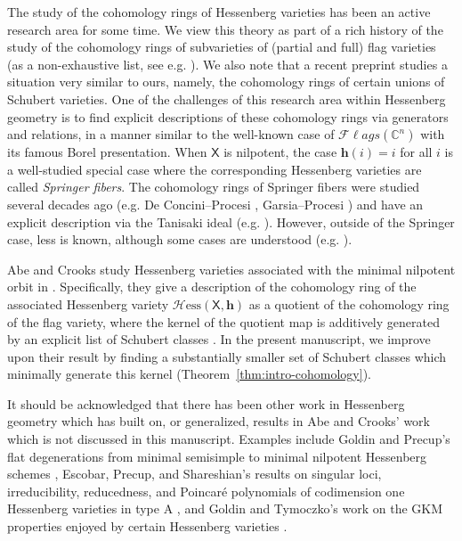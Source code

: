 \documentclass[11pt]{amsart}
\theoremstyle{plain}
\theoremstyle{definition}
\newcommand{\Hess}{\mathcal{H}\mathrm{ess}}
\newcommand{\mx}{\mathsf{X}}
\newcommand{\hess}{{\mathbf h}}
\newcommand{\Fl}{\mathcal{F}\ell ags}
\newcommand{\C}{\mathbb{C}}           %
\numberwithin{equation}{section}
\begin{document}
The study of the cohomology rings of Hessenberg varieties has been an active research area for some time. We view this theory as part of a rich history of the study of the cohomology rings of subvarieties of (partial and full) flag varieties (as a non-exhaustive list, see e.g. \cite{GasharovReiner, MbirikaTymoczko, ReinerWooYong, StDizierYong}).  We also note that a recent preprint \cite{AGR2026} studies a situation very similar to ours, namely, the cohomology rings of certain unions of Schubert varieties. 
One of the challenges of this research area within Hessenberg geometry is to find explicit descriptions of these cohomology rings via generators and relations, in a manner similar to the well-known case of $\Fl(\C^n)$ with its famous Borel presentation. When $\mx$ is nilpotent, the case $\hess(i)=i$ for all $i$ is a well-studied special case where the corresponding Hessenberg varieties are called \textit{Springer fibers}. The cohomology rings of Springer fibers were studied several decades ago (e.g. De Concini--Procesi \cite{DeConciniProcesi}, Garsia--Procesi \cite{GarsiaProcesi}) and have an explicit description via the Tanisaki ideal 
(e.g. \cite{GarsiaProcesi, Tanisaki}). However, outside of the 
Springer case, less is known, although some cases are understood (e.g. \cite{AHHM2019, AHM2019}).


Abe and Crooks study Hessenberg varieties associated with the minimal nilpotent orbit in \cite{AbeCrooks}. Specifically, they give a description of the cohomology ring of the associated Hessenberg variety $\Hess(\mx, \hess)$ as a quotient of the cohomology ring of the flag variety, where the kernel of the quotient map is additively generated by an explicit list of Schubert classes \cite[Theorem 32]{AbeCrooks}. In the present manuscript, we improve upon their result by finding a substantially smaller set of Schubert classes which minimally generate this kernel (Theorem~\ref{thm:intro-cohomology}). 

It should be acknowledged that there has been other work in Hessenberg geometry which has built on, or generalized, results in Abe and Crooks' work which is not discussed in this manuscript. Examples include Goldin and Precup's flat degenerations from minimal semisimple to minimal nilpotent Hessenberg schemes \cite{GoldinPrecup-flat}, Escobar, Precup, and Shareshian's results on singular loci, irreducibility, reducedness, and Poincaré polynomials of  codimension one Hessenberg varieties in type A \cite{EscobarPrecupShareshian}, and Goldin and Tymoczko's work on the GKM properties enjoyed by certain Hessenberg varieties \cite{GoldinTymoczko}. 
\end{document}
